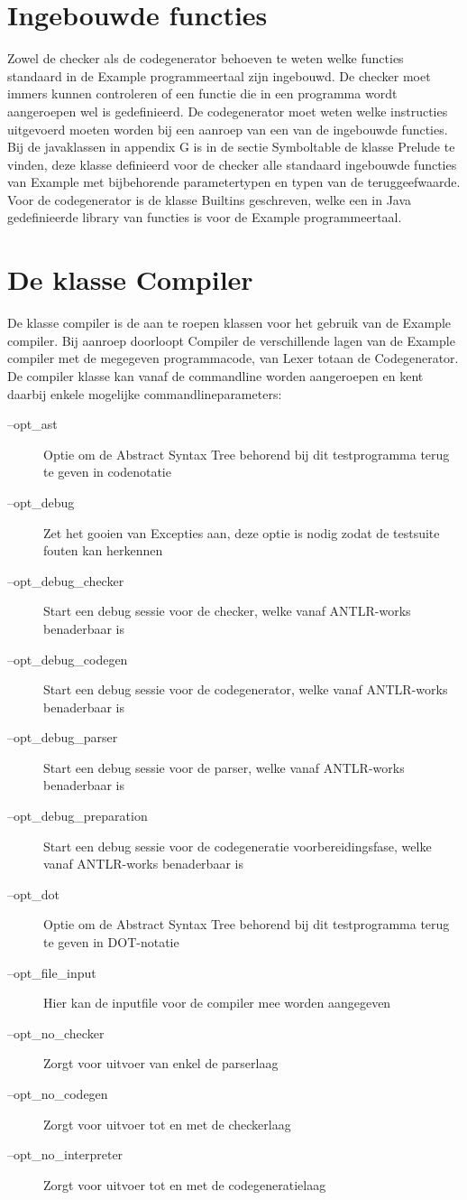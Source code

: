 \section{Ingebouwde functies}
Zowel de checker als de codegenerator behoeven te weten welke functies standaard in de Example programmeertaal zijn ingebouwd. De checker moet immers kunnen controleren of een functie die in een programma wordt aangeroepen wel is gedefinieerd. De codegenerator moet weten welke instructies uitgevoerd moeten worden bij een aanroep van een van de ingebouwde functies. Bij de javaklassen in appendix G is in de sectie Symboltable de klasse Prelude te vinden, deze klasse definieerd voor de checker alle standaard ingebouwde functies van Example met bijbehorende parametertypen en typen van de teruggeefwaarde. Voor de codegenerator is de klasse Builtins geschreven, welke een in Java gedefinieerde library van functies is voor de Example programmeertaal.

\section{De klasse Compiler}
De klasse compiler is de aan te roepen klassen voor het gebruik van de Example compiler. Bij aanroep doorloopt Compiler de verschillende lagen van de Example compiler met de megegeven programmacode, van Lexer totaan de Codegenerator. De compiler klasse kan vanaf de commandline worden aangeroepen en kent daarbij enkele mogelijke commandlineparameters:
\begin{description}
    \item[--opt\_ast]                   Optie om de Abstract Syntax Tree behorend bij dit testprogramma terug te geven in codenotatie
    \item[--opt\_debug]                 Zet het gooien van Excepties aan, deze optie is nodig zodat de testsuite fouten kan herkennen
    \item[--opt\_debug\_checker]        Start een debug sessie voor de checker, welke vanaf ANTLR-works benaderbaar is
    \item[--opt\_debug\_codegen]        Start een debug sessie voor de codegenerator, welke vanaf ANTLR-works benaderbaar is
    \item[--opt\_debug\_parser]         Start een debug sessie voor de parser, welke vanaf ANTLR-works benaderbaar is
    \item[--opt\_debug\_preparation]    Start een debug sessie voor de codegeneratie voorbereidingsfase, welke vanaf ANTLR-works benaderbaar is
    \item[--opt\_dot]                   Optie om de Abstract Syntax Tree behorend bij dit testprogramma terug te geven in DOT-notatie
    \item[--opt\_file\_input]           Hier kan de inputfile voor de compiler mee worden aangegeven
    \item[--opt\_no\_checker]           Zorgt voor uitvoer van enkel de parserlaag
    \item[--opt\_no\_codegen]           Zorgt voor uitvoer tot en met de checkerlaag
    \item[--opt\_no\_interpreter]       Zorgt voor uitvoer tot en met de codegeneratielaag
\end{description}
